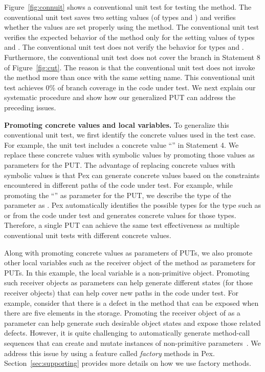 Figure~\ref{fig:connuit} shows a conventional unit test for testing the  method. The conventional unit test saves two setting values (of types  and ) and verifies whether the values are set properly using the  method. The conventional unit test verifies the expected behavior of the  method only for the setting values of types  and . The conventional unit test does not verify the behavior for types  and . Furthermore, the conventional unit test does not cover the  branch in Statement 8 of Figure~\ref{fig:cut}. The reason is that the conventional unit test does not invoke the  method more than once with the same setting name. This conventional unit test achieves $0$\% of branch coverage in the code under test. We next explain our systematic procedure and show how our generalized PUT can address the preceding issues.

\textbf{Promoting concrete values and local variables.} 
To generalize this conventional unit test, we first identify the concrete values used in the test case. For example, the unit test includes a concrete  value ``'' in Statement 4. We replace these concrete values with symbolic values by promoting those values as parameters for the PUT. The advantage of replacing concrete values with symbolic values is that Pex can generate concrete values based on the constraints encountered in different paths of the code under test. For example, while promoting the ``'' as parameter for the PUT, we describe the type of the parameter as . Pex automatically identifies the possible types for the  type such as  or  from the code under test and generates concrete values for those types. Therefore, a single PUT can achieve the same test effectiveness as multiple conventional unit tests with different concrete values. 

Along with promoting concrete values as parameters of PUTs, we also promote other local variables such as the receiver object of the  method as parameters for PUTs. In this example, the local variable  is a non-primitive object. Promoting such receiver objects as parameters can help generate different states (for those receiver objects) that can help cover new paths in the code under test. For example, consider that there is a defect in the  method that can be exposed when there are five elements in the storage. Promoting the receiver object of  as a parameter can help generate such desirable object states and expose those related defects. However, it is quite challenging to automatically generate method-call sequences that can create and mutate instances of non-primitive parameters~\cite{}. We address this issue by using a feature called \emph{factory} methods in Pex. Section~\ref{sec:supporting} provides more details on how we use factory methods.

